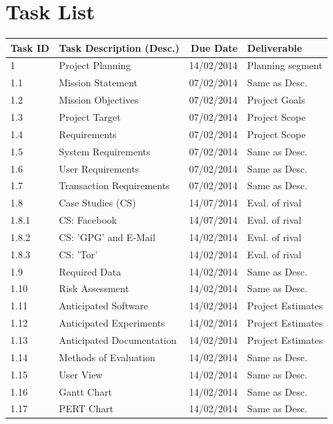 
\section{Task List}

\begin{tabular}{llrl}

    \toprule
    
    Task ID  & Task Description (Desc.)     & Due Date    & Deliverable       \\
    
    \midrule
    
    1        & Project Planning             & 14/02/2014  & Planning segment  \\
    1.1      & Mission Statement            & 07/02/2014  & Same as Desc.     \\
    1.2      & Mission Objectives           & 07/02/2014  & Project Goals     \\
    1.3      & Project Target               & 07/02/2014  & Project Scope     \\
    1.4      & Requirements                 & 07/02/2014  & Project Scope     \\
    1.5      & System Requirements          & 07/02/2014  & Same as Desc.     \\
    1.6      & User Requirements            & 07/02/2014  & Same as Desc.     \\
    1.7      & Transaction Requirements     & 07/02/2014  & Same as Desc.     \\
    
    \cmidrule(r){2-3}
    1.8      & Case Studies (CS)            & 14/07/2014  & Eval. of rival    \\
    1.8.1    & CS: Facebook                 & 14/07/2014  & Eval. of rival    \\
    1.8.2    & CS: 'GPG' and E-Mail         & 14/02/2014  & Eval. of rival    \\
    1.8.3    & CS: 'Tor'                    & 14/02/2014  & Eval. of rival    \\
    \cmidrule(r){2-3}
    
    1.9      & Required Data                & 14/02/2014  & Same as Desc.     \\
    1.10     & Risk Assessment              & 14/02/2014  & Same as Desc.     \\
    1.11     & Anticipated Software         & 14/02/2014  & Project Estimates \\
    1.12     & Anticipated Experiments      & 14/02/2014  & Project Estimates \\
    1.13     & Anticipated Documentation    & 14/02/2014  & Project Estimates \\
    1.14     & Methods of Evaluation        & 14/02/2014  & Same as Desc.     \\
    1.15     & User View                    & 14/02/2014  & Same as Desc.     \\
    1.16     & Gantt Chart                  & 14/02/2014  & Same as Desc.     \\
    1.17     & PERT Chart                   & 14/02/2014  & Same as Desc.     \\
    

\end{tabular}
